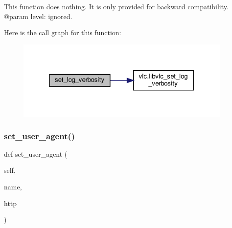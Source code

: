 \begin{DoxyVerb}This function does nothing.
It is only provided for backward compatibility.
@param level: ignored.
\end{DoxyVerb}
 Here is the call graph for this function\+:
\nopagebreak
\begin{figure}[H]
\begin{center}
\leavevmode
\includegraphics[width=301pt]{classvlc_1_1_instance_a037c3684941fe221e207bdc55d10c44d_cgraph}
\end{center}
\end{figure}
\mbox{\label{classvlc_1_1_instance_a363684325b3a6baa1168f7f89f4b9bb4}} 
\subsubsection{\texorpdfstring{set\+\_\+user\+\_\+agent()}{set\_user\_agent()}}
{\footnotesize\ttfamily def set\+\_\+user\+\_\+agent (\begin{DoxyParamCaption}\item[{}]{self,  }\item[{}]{name,  }\item[{}]{http }\end{DoxyParamCaption})}

